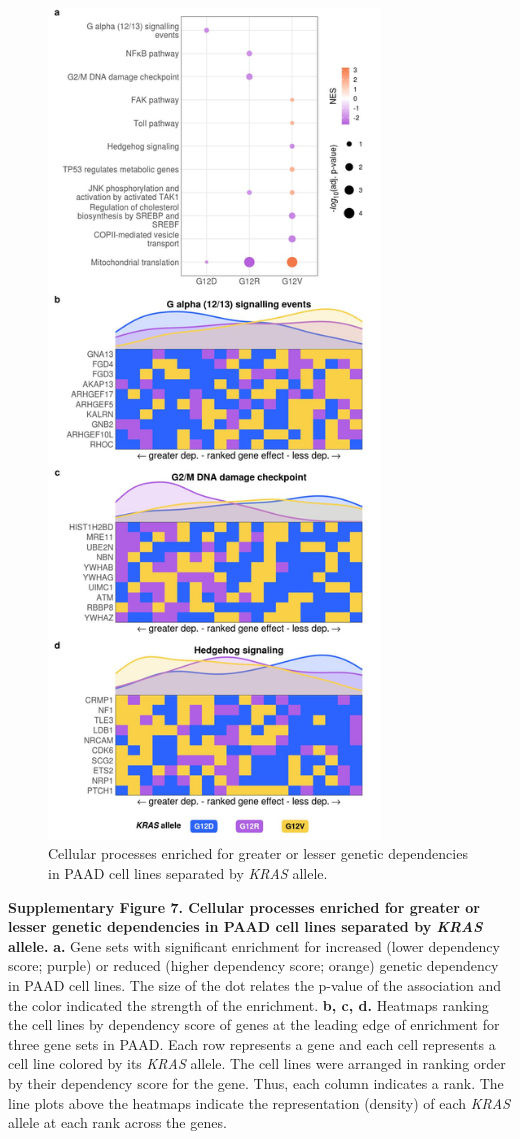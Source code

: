\documentclass[english, 10pt, letterpaper]{article}
\newcommand{\KRAS}{\emph{KRAS}}
\begin{document}
\begin{figure}[h!]
\centering
\includegraphics[width=88mm]{figures/Supp_Fig_7.jpeg}
\caption{Cellular processes enriched for greater or lesser genetic dependencies in PAAD cell lines separated by \KRAS{} allele.}
\label{sfig:paad-dependency-gsea}
\end{figure}

\newpage
\noindent \textbf{Supplementary Figure 7. Cellular processes enriched for greater or lesser genetic dependencies in PAAD cell lines separated by \KRAS{} allele.}
\textbf{a.} Gene sets with significant enrichment for increased (lower dependency score; purple) or reduced (higher dependency score; orange) genetic dependency in PAAD cell lines. The size of the dot relates the p-value of the association and the color indicated the strength of the enrichment.
\textbf{b, c, d.} Heatmaps ranking the cell lines by dependency score of genes at the leading edge of enrichment for three gene sets in PAAD. Each row represents a gene and each cell represents a cell line colored by its \KRAS{} allele. The cell lines were arranged in ranking order by their dependency score for the gene. Thus, each column indicates a rank. The line plots above the heatmaps indicate the representation (density) of each \KRAS{} allele at each rank across the genes.
\newpage
\end{document}
